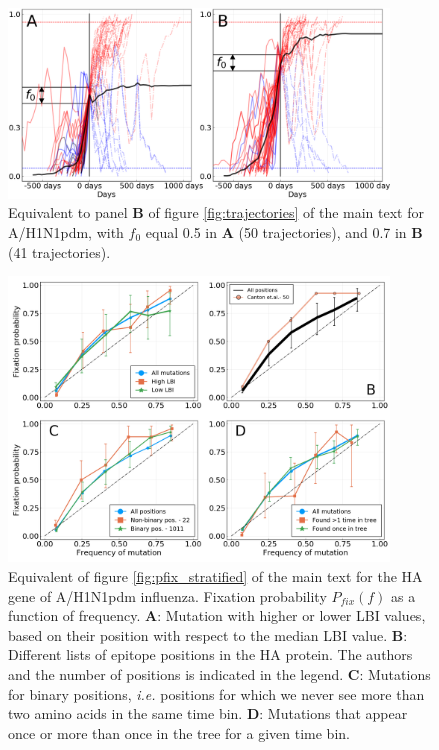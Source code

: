 \documentclass[reprint,amsmath,amssymb,superscriptaddress,showpacs,rmp]{revtex4-1}
\begin{document}
	\begin{figure}
		\centering
		\includegraphics[width=0.9\textwidth]{./SM_figures/ShortTerm_h1n1_varf0.png}
		\caption{Equivalent to panel \textbf{B} of figure \ref{fig:trajectories} of the main text for A/H1N1pdm, with $f_0$ equal 0.5 in \textbf{A} (50 trajectories), and  0.7 in \textbf{B} (41 trajectories).}
		\label{fig:trajectories_h1n1_varf0}
	\end{figure}

	
	\begin{figure}
		\centering
		\includegraphics[width=0.9\textwidth]{./SM_figures/pfix_v_freq_strat_h1n1pdm.png}
		\caption{Equivalent of figure \ref{fig:pfix_stratified} of the main text for the HA gene of A/H1N1pdm influenza. Fixation probability $P_{fix}(f)$ as a function of frequency. \textbf{A}: Mutation with higher or lower LBI values, based on their position with respect to the median LBI value. \textbf{B}: Different lists of epitope positions in the HA protein. The authors and the number of positions is indicated in the legend. \textbf{C}: Mutations for binary positions, \emph{i.e.} positions for which we never see more than two amino acids in the same time bin. \textbf{D}: Mutations that appear once or more than once in the tree for a given time bin.}
		\label{fig:pfix_stratified_h1n1}
	\end{figure}
\end{document}
